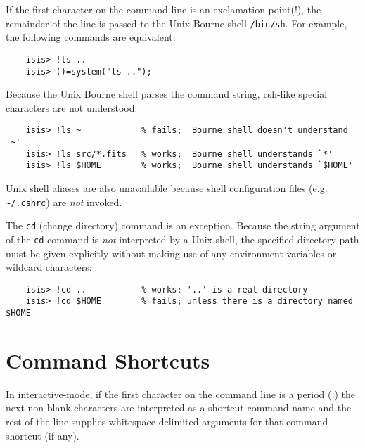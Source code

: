 \documentclass{book}
\begin{document}
If the first character on the command line is an exclamation
point(!), the remainder
of the line is passed to the Unix Bourne shell {\tt /bin/sh}.  For example,
the following commands are equivalent:
\begin{verbatim}
    isis> !ls ..
    isis> ()=system("ls ..");
\end{verbatim}

Because the Unix Bourne shell parses the command string,
csh-like special characters are not understood:
\begin{verbatim}
    isis> !ls ~            % fails;  Bourne shell doesn't understand '~'
    isis> !ls src/*.fits   % works;  Bourne shell understands `*'
    isis> !ls $HOME        % works;  Bourne shell understands `$HOME'
\end{verbatim}
Unix shell aliases are also unavailable because shell configuration files
(e.g. \verb|~/.cshrc|) are {\it not} invoked.

The {\tt cd} (change directory) command is an exception. Because the
string argument of the {\tt cd} command is {\it not} interpreted by a Unix
shell, the specified directory path must be given explicitly without
making use of any environment variables or wildcard characters:
\begin{verbatim}
    isis> !cd ..           % works; '..' is a real directory
    isis> !cd $HOME        % fails; unless there is a directory named $HOME
\end{verbatim}

\section{Command Shortcuts}
\label{sec:shortcuts}

In interactive-mode, if the first character on the command line is a
period (.) the next non-blank characters are interpreted as a shortcut
command name and the rest of the line supplies whitespace-delimited
arguments for that command shortcut (if any).
\end{document}
